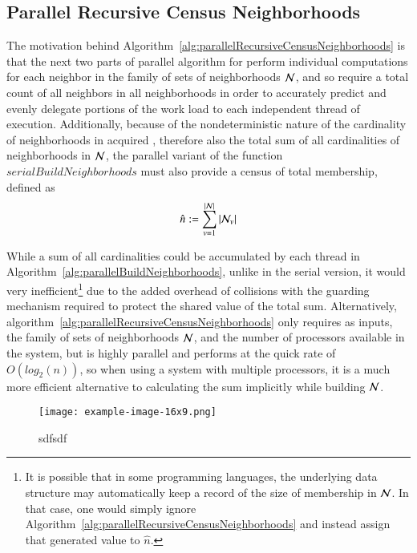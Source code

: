 %
%
\subsection{Parallel Recursive Census Neighborhoods}
\label{ch6sBNPssPRCN}
The motivation behind Algorithm~\ref{alg:parallelRecursiveCensusNeighborhoods} is that the next two parts of parallel algorithm for  perform individual computations for each neighbor in the family of sets of neighborhoods $\mathcal{N}$, and so require a total count of all neighbors in all neighborhoods in order to accurately predict and evenly delegate portions of the work load to each independent thread of execution. Additionally, because of the nondeterministic nature of the cardinality of neighborhoods in acquired \tdd{}, therefore also the total sum of all cardinalities of neighborhoods in $\mathcal{N}$, the parallel variant of the function $\mathit{serialBuildNeighborhoods}$ must also provide a census of total membership, defined as
%
\begin{equation}
	\hat{n} := \sum\limits_{v=1}^{|\mathcal{N}|}{|\mathcal{N}_v|}
	\label{eq:censusNeighborhoods}
\end{equation}%
%

While a sum of all cardinalities could be accumulated by each thread in  Algorithm~\ref{alg:parallelBuildNeighborhoods}, unlike in the serial version, it would very inefficient\footnote{It is possible that in some programming languages, the underlying data structure may automatically keep a record of the size of membership in $\mathcal{N}$. In that case, one would simply ignore Algorithm~\ref{alg:parallelRecursiveCensusNeighborhoods} and instead assign that generated value to $\hat{n}$.} due to the added overhead of collisions with the guarding mechanism required to protect the shared value of the total sum.  Alternatively, algorithm~\ref{alg:parallelRecursiveCensusNeighborhoods} only requires as inputs, the family of sets of neighborhoods $\mathcal{N}$, and the number of processors available in the system, but is highly parallel and performs at the quick rate of $O(log_2(n))$, so when using a system with multiple processors, it is a much more efficient alternative to calculating the sum implicitly while building $\mathcal{N}$.

\begin{figure}[ht]
	{\texttt{[image: example-image-16x9.png]}}
	{\caption[wefwefwef]{sdfsdf}\label{fig:wfwef}}
\end{figure}

